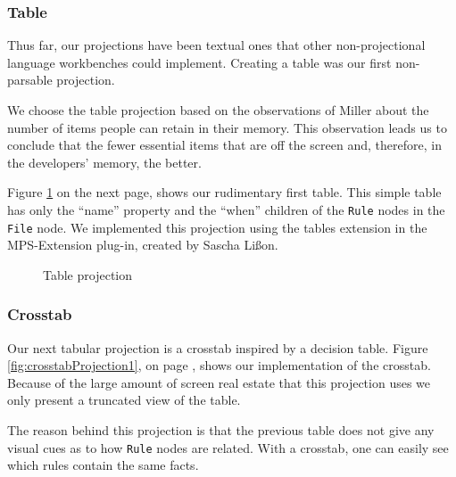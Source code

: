 \newpage

\subsubsection{Table}
Thus far, our projections have been textual ones that other non-projectional language workbenches could implement.
Creating a table was our first non-parsable projection.

We choose the table projection based on the observations of Miller\cite{miller1956magical} about the number of items people can retain in their memory.
This observation leads us to conclude that the fewer essential items that are off the screen and, therefore, in the developers' memory, the better.

Figure \ref{fig:tableProjection1} on the next page, shows our rudimentary first table.
This simple table has only the ``name'' property and the ``when'' children of the \texttt{Rule} nodes in the \texttt{File} node.
We implemented this projection using the tables extension in the MPS-Extension plug-in, created by Sascha Lißon.

\begin{figure}
    \centering
    \caption{Table projection}
    \label{fig:tableProjection1}
\end{figure}

\subsubsection{Crosstab}
Our next tabular projection is a crosstab inspired by a decision table.
Figure \ref{fig:crosstabProjection1}, on page \pageref{fig:crosstabProjection1}, shows our implementation of the crosstab.
Because of the large amount of screen real estate that this projection uses we only present a truncated view of the table.

The reason behind this projection is that the previous table does not give any visual cues as to how \texttt{Rule} nodes are related.
With a crosstab, one can easily see which rules contain the same facts.


